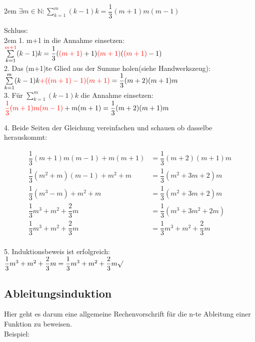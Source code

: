 \documentclass[11pt,final]{scrreprt}
\newcommand{\br} {\medskip\\}
\newcommand{\N} {\mathbb N}
\begin{document}
\begingroup
\leftskip2em 
$ \exists m \in \N \colon \sum\limits_{k=1}^m (k-1)k = \dfrac{1}{3} (m+1)m(m-1) $\\
\par	
\endgroup 

Schluss:\\

\begingroup
\leftskip2em 
1. m+1 in die Annahme einsetzen:\\
$ \sum\limits_{k=1}^{\textcolor{red}{m+1}} (k-1)k = \dfrac{1}{3} (\textcolor{red}{(m+1)}+1)\textcolor{red}{(m+1)}(\textcolor{red}{(m+1)}-1) $\smallskip\br
2. Das (m+1)te Glied aus der Summe holen(siehe Handwerkszeug):\\
$ \sum\limits_{k=1}^m (k-1)k \textcolor{red}{+ ((m+1)-1)(m+1)} = \dfrac{1}{3} (m+2)(m+1)m $\br
3. Für $ \sum\limits_{k=1}^m (k-1)k $ die Annahme einsetzen: \\
$ \textcolor{red}{\dfrac{1}{3} (m+1)m(m-1)} + m(m+1) = \dfrac{1}{3} (m+2)(m+1)m $\br
\par	
\endgroup 

4. Beide Seiten der Gleichung vereinfachen und schauen ob dasselbe herauskommt:

\begin{align*}
 \dfrac{1}{3} (m+1)m(m-1) + m(m+1)&= \dfrac{1}{3} (m+2)(m+1)m  \\
 \dfrac{1}{3} (m^2+m)(m-1) + m^2 + m &= \dfrac{1}{3} (m^2+3m+2)m  \\
 \dfrac{1}{3} (m^3 -m) + m^2 + m &= \dfrac{1}{3} (m^2+3m+2)m  \\
 \dfrac{1}{3} m^3 + m^2 + \dfrac{2}{3} m &= \dfrac{1}{3} (m^3+3m^2+2m)\\
 \dfrac{1}{3} m^3 + m^2 + \dfrac{2}{3} m &= \dfrac{1}{3} m^3 + m^2 + \dfrac{2}{3} m\\
\end{align*}

5. Induktionsbeweis ist erfolgreich:\\
$ \dfrac{1}{3} m^3 + m^2 + \dfrac{2}{3} m = \dfrac{1}{3} m^3 + m^2 + \dfrac{2}{3} m \surd $\\

\subsection{Ableitungsinduktion}

Hier geht es darum eine allgemeine Rechenvorschrift für die n-te Ableitung einer Funktion zu beweisen.\\

Beispiel:\\
\end{document}
